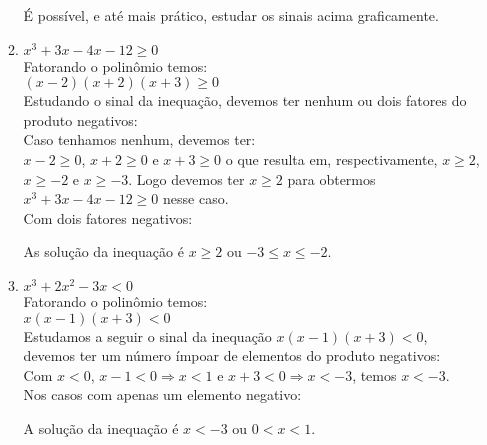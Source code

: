 \begin{enumerate}
\begin{enumerate}
			É possível, e até mais prático, estudar os sinais acima graficamente.
		\item  %
			$x^3 + 3x - 4x - 12 \geq 0$ \\
			Fatorando o polinômio temos:\\
			$ (x-2)(x+2)(x+3) \geq 0$\\
			Estudando o sinal da inequação, devemos ter nenhum ou dois fatores do produto negativos:\\
			Caso tenhamos nenhum, devemos ter:\\
			$ x-2 \geq 0 $, $ x+2 \geq 0 $ e $x+3 \geq 0$ o que resulta em, respectivamente, $ x \geq 2 $, $ x \geq -2 $ e $x \geq -3$. Logo devemos ter $x \geq 2$ para obtermos $x^3 + 3x - 4x - 12 \geq 0$ nesse caso.\\
			Com dois fatores negativos:
			As solução da inequação é $x \geq 2$ ou $-3 \leq x \leq -2$.
		\item  %
			$x^3 + 2x^2 - 3x < 0$\\
			Fatorando o polinômio temos:\\
			$x(x - 1)(x + 3) < 0$ \\
			Estudamos a seguir o sinal da inequação $x(x - 1)(x + 3) < 0$, devemos ter um número ímpoar de elementos do produto negativos: \\
			Com $x < 0$, $x - 1 < 0 \Rightarrow x < 1$ e $x + 3 < 0 \Rightarrow x < -3$, temos $x < -3$.\\
			Nos casos com apenas um elemento negativo:
			A solução da inequação é $x < -3$ ou $0 < x < 1$.


\end{enumerate}
\end{enumerate}
